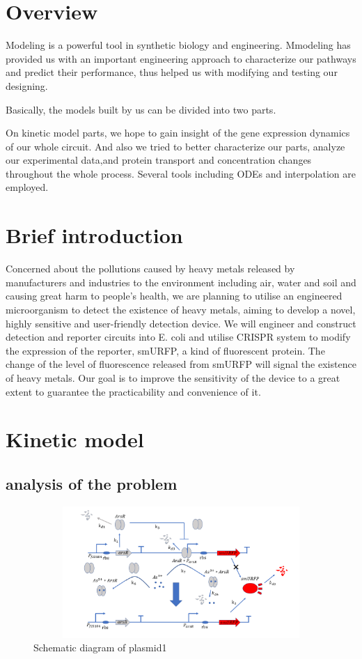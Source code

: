 \section{Overview}
Modeling is a powerful tool in synthetic biology and engineering. Mmodeling has provided us with an important engineering approach to characterize our pathways and predict their performance, thus helped us with modifying and testing our designing.

Basically, the models built by us can be divided into two parts.

On kinetic model parts, we hope to gain insight of the gene expression dynamics of our whole circuit. And also we tried to better characterize our parts, analyze our experimental data,and protein transport and concentration changes throughout the whole process. Several tools including ODEs and interpolation are employed.

\section{Brief introduction}
Concerned about the pollutions caused by heavy metals released by manufacturers and industries to the environment including air, water and soil and causing great harm to people’s health, we are planning to utilise an engineered microorganism to detect the existence of heavy metals, aiming to develop a novel, highly sensitive and user-friendly detection device. We will engineer and construct detection and reporter circuits into E. coli and utilise CRISPR system to modify the expression of the reporter, smURFP, a kind of fluorescent protein. The change of the level of fluorescence released from smURFP will signal the existence of heavy metals. Our goal is to improve the sensitivity of the device to a great extent to guarantee the practicability and convenience of it.
\section{Kinetic model}
\subsection{analysis of the problem}

\begin{figure}[h]
\centering
\includegraphics[width=12cm,height=5cm]{1}
\caption{Schematic diagram of plasmid1}
\end{figure}

